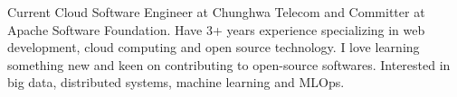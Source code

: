 

\begin{cvparagraph}

Current Cloud Software Engineer at Chunghwa Telecom and Committer at Apache Software Foundation. Have 3+ years experience specializing in web development, cloud computing and open source technology. I love learning something new and keen on contributing to open-source softwares. Interested in big data, distributed systems, machine learning and MLOps.
\end{cvparagraph}
